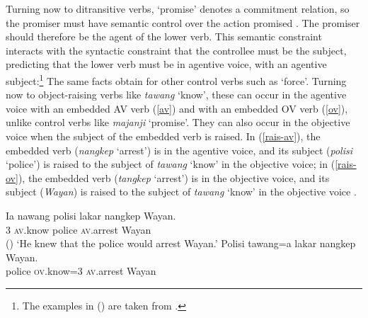 Turning now to ditransitive verbs,  `promise' denotes a commitment relation, so the promiser must have
semantic control over the action promised \parencites{Farkas1988}[Section~2.4]{Kroeger1993}[]{SagandPollard1991}. The
promiser should therefore be the agent of the lower verb. This semantic constraint interacts
with the syntactic constraint that the controllee must be the subject, predicting that the
lower verb must be in agentive voice, with an agentive subject:\footnote{%
  The examples in () are taken from .
}
\eal
{}
\zl
\largerpage
The same facts obtain for other control verbs such as  `force'.
Turning now to object-raising verbs like \emph{tawang} `know',  these can occur in the agentive
voice with an embedded AV verb (\ref{av}) and with an embedded OV verb (\ref{ov}), unlike control
verbs like \emph{majanji} `promise'. 
They can also occur in the objective voice when the subject of the embedded verb is raised.  In
(\ref{rais-av}), the embedded verb (\emph{nangkep} `arrest') is in the agentive voice, and its
subject (\emph{polisi} `police') is raised to the subject of \emph{tawang} `know' in the objective
voice; in (\ref{rais-ov}), the embedded verb (\emph{tangkep} `arrest') is in the objective voice, and
its subject (\emph{Wayan}) is raised to the subject of \emph{tawang} `know' in the objective voice \citep[ex 23]{WechslerandArka1998}.

\eal
\ex 
\label{av}
\gll Ia nawang          polisi lakar  nangkep            Wayan. \\
     3 \textsc{av}.know police \FUT{} \textsc{av}.arrest Wayan \\\hfill()
\glt `He knew that the police would arrest Wayan.'
\ex
\label{rais-av} 
\gll Polisi tawang=a           lakar  nangkep            Wayan. \\
     police \textsc{ov}.know=3 \FUT{} \textsc{av}.arrest Wayan\\

